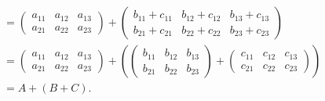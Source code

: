 \begin{exemplo}
\begin{enumerate}[label={\arabic*})]
\begin{solucao}
\begin{itemize}
\begin{align*}
						      \\ &= \begin{pmatrix} a_{11} & a_{12} & a_{13}\\a_{21} & a_{22} & a_{23}\end{pmatrix} + \begin{pmatrix} b_{11} + c_{11} & b_{12} + c_{12} & b_{13} + c_{13}\\b_{21} + c_{21} & b_{22} + c_{22} & b_{23} + c_{23}\end{pmatrix}
						      \\ &= \begin{pmatrix} a_{11} & a_{12} & a_{13}\\a_{21} & a_{22} & a_{23}\end{pmatrix} +
						      \left(\begin{pmatrix} b_{11} & b_{12} & b_{13}\\b_{21} & b_{22} & b_{23}\end{pmatrix} +
						      \begin{pmatrix} c_{11} & c_{12} & c_{13}\\c_{21} & c_{22} & c_{23}\end{pmatrix}\right)
						      \\ &= A + (B + C).
					      \end{align*}


\end{itemize}
\end{solucao}
\end{enumerate}
\end{exemplo}
